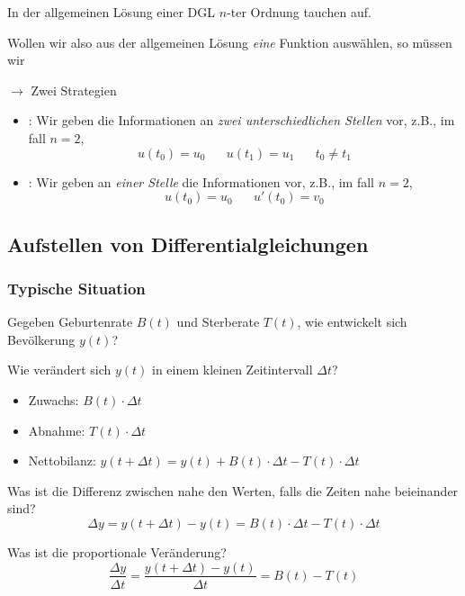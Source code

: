 In der allgemeinen Lösung einer DGL $n$-ter Ordnung tauchen  auf.

Wollen wir also aus der allgemeinen Lösung \textit{eine} Funktion auswählen, so müssen wir 

$\to$ Zwei Strategien
\vspace{-0.6em}
\begin{itemize}
    \item {}: Wir geben die Informationen an \textit{zwei unterschiedlichen Stellen} vor, z.B., im fall $n = 2$,
    $$u(t_0) = u_0 \hspace{20pt} u(t_1) = u_1 \hspace{20pt} t_0 \ne t_1$$
    \item {}: Wir geben an \textit{einer Stelle} die Informationen vor, z.B., im fall $n = 2$,
    $$u(t_0) = u_0 \hspace{20pt} u'(t_0) = v_0$$
\end{itemize}

\subsection{Aufstellen von Differentialgleichungen}

\subsubsection{Typische Situation}

Gegeben Geburtenrate $B(t)$ und Sterberate $T(t)$, wie entwickelt sich Bevölkerung $y(t)$?

Wie verändert sich $y(t)$ in einem kleinen Zeitintervall $\Delta t$?
\vspace{-0.6em}
\begin{itemize}
    \item Zuwachs: $B(t) \cdot \Delta t$
    \item Abnahme: $T(t) \cdot \Delta t$
    \item Nettobilanz: $y(t + \Delta t) = y(t) + B(t) \cdot \Delta t - T(t) \cdot \Delta t$
\end{itemize}

Was ist die Differenz zwischen nahe den Werten, falls die Zeiten nahe beieinander sind?
$$\Delta y = y(t + \Delta t) - y(t) = B(t) \cdot \Delta t - T(t) \cdot \Delta t $$

Was ist die proportionale Veränderung?
$$\frac{\Delta y}{\Delta t} = \frac{y(t + \Delta t) - y(t)}{\Delta t} = B(t) - T(t)$$

